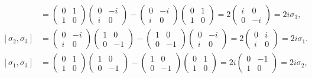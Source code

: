 \begin{align*}
[\sigma_1,\sigma_2]
&=
\begin{pmatrix}0&1\\1&0\end{pmatrix}
\begin{pmatrix}0&-i\\i&0\end{pmatrix}
-
\begin{pmatrix}0&-i\\i&0\end{pmatrix}
\begin{pmatrix}0&1\\1&0\end{pmatrix}
=
2\begin{pmatrix}i&0\\0&-i \end{pmatrix}
=
2i\sigma_3,
\\
[\sigma_2,\sigma_3]
&=
\begin{pmatrix}0&-i\\i&0\end{pmatrix}
\begin{pmatrix}1&0\\0&-1\end{pmatrix}
-
\begin{pmatrix}1&0\\0&-1\end{pmatrix}
\begin{pmatrix}0&-i\\i&0\end{pmatrix}
=
2
\begin{pmatrix}0&i\\i&0\end{pmatrix}
=
2i\sigma_1.
\\
[\sigma_1,\sigma_3]
&=
\begin{pmatrix}0&1\\1&0\end{pmatrix}
\begin{pmatrix}1&0\\0&-1\end{pmatrix}
-
\begin{pmatrix}1&0\\0&-1\end{pmatrix}
\begin{pmatrix}0&1\\1&0\end{pmatrix}
=
2i
\begin{pmatrix}0&-1\\1&0\end{pmatrix}
=
2i\sigma_2,
\end{align*}
